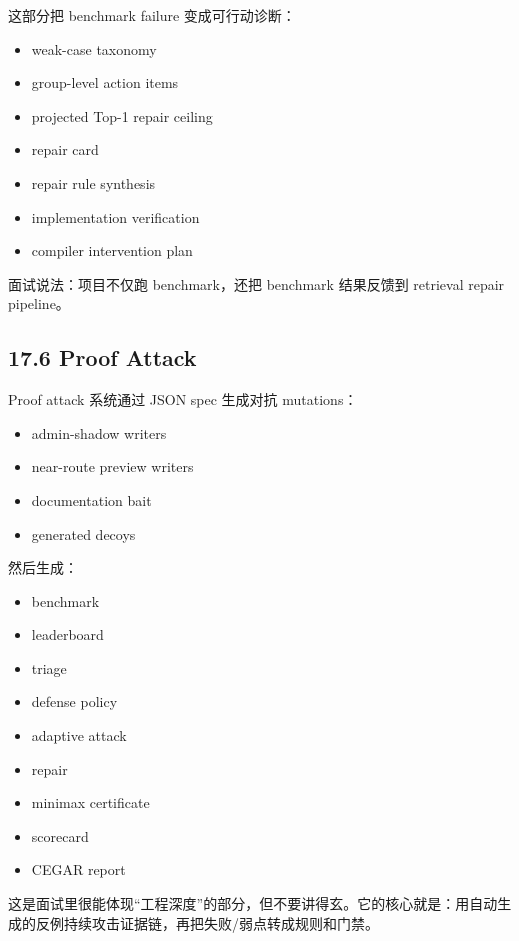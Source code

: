 \documentclass[UTF8,12pt,openany]{ctexbook}
\begin{document}
这部分把 benchmark failure 变成可行动诊断：\par

\begin{itemize}
\item weak-case taxonomy
\item group-level action items
\item projected Top-1 repair ceiling
\item repair card
\item repair rule synthesis
\item implementation verification
\item compiler intervention plan
\end{itemize}

面试说法：项目不仅跑 benchmark，还把 benchmark 结果反馈到 retrieval repair pipeline。\par

\subsection{17.6 Proof Attack}

Proof attack 系统通过 JSON spec 生成对抗 mutations：\par

\begin{itemize}
\item admin-shadow writers
\item near-route preview writers
\item documentation bait
\item generated decoys
\end{itemize}

然后生成：\par

\begin{itemize}
\item benchmark
\item leaderboard
\item triage
\item defense policy
\item adaptive attack
\item repair
\item minimax certificate
\item scorecard
\item CEGAR report
\end{itemize}

这是面试里很能体现“工程深度”的部分，但不要讲得玄。它的核心就是：用自动生成的反例持续攻击证据链，再把失败/弱点转成规则和门禁。\par
\end{document}
